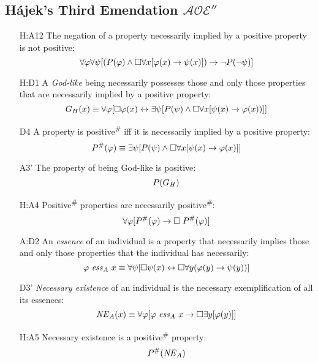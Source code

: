 \documentclass{birkjour}
\newcommand{\AOEHHH}{$\mathcal{AOE}''$}
\theoremstyle{definition}
\theoremstyle{remark}
\numberwithin{equation}{section}
\begin{document}
\begin{appendix}
\section{Hájek's Third Emendation \AOEHHH} \label{apx:Hajek3}
\begin{itemize}
\item[H:A12] The negation of a property necessarily implied by a
  positive property is not positive:
  $$\forall \varphi \forall \psi [(P(\varphi) \wedge \Box \forall x [\varphi(x)
  \rightarrow \psi(x)]) \rightarrow \neg P(\neg \psi)]$$
\item[H:D1] A \emph{God-like} being necessarily possesses those and only those properties that are necessarily implied by a positive property: 
  $$G_H(x) \equiv \forall \varphi [\Box \varphi(x) \leftrightarrow \exists \psi[P(\psi) \wedge \Box \forall x [\psi(x)  \rightarrow \varphi(x))]]$$ 
\item[D4]  A property is positive\textsuperscript{\#} iff it is necessarily implied by a positive property: 
  $$P^\#(\varphi) \equiv \exists \psi[P(\psi) \wedge \Box \forall x[\psi(x) \rightarrow \varphi(x)]]$$
\item[A3']  The property of being God-like is positive: 
  $$P(G_H)$$
\item[H:A4]  Positive\textsuperscript{\#} properties are necessarily positive\textsuperscript{\#}: 
  $$\forall \varphi [P^\#(\varphi) \rightarrow \Box \; P^\#(\varphi)]$$ 
\item[A:D2] An \emph{essence} of an individual is a property that necessarily implies those and only those properties that the individual has necessarily: $$\varphi \ \mathit{ess}_A \ x \equiv \forall
  \psi [\Box \psi(x) \leftrightarrow \Box \forall y (\varphi(y) \rightarrow \psi(y))]$$ 
\item[D3'] \emph{Necessary existence} of an individual is the necessary exemplification of all its essences: 
  $$\mathit{NE}_A(x) \equiv \forall \varphi [\varphi \ \mathit{ess}_A \ x \rightarrow \Box
  \exists y [\varphi(y)]]$$
\item[H:A5] Necessary existence is a positive\textsuperscript{\#} property: $$P^\#(\mathit{NE}_A)$$ 
% 
\end{itemize}


\end{appendix}
\end{document}
